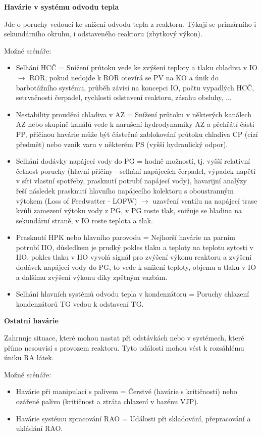 \textbf{Havárie v systému odvodu tepla}

Jde o poruchy vedoucí ke snížení odvodu tepla z reaktoru. Týkají se primárního i sekundárního okruhu, i odstaveného reaktoru (zbytkový výkon).

Možné  scénáře:

\begin{itemize}
    \item Selhání HCČ = Snížení průtoku vede ke zvýšení teploty a tlaku chladiva v IO $\rightarrow$ ROR, pokud nedojde k ROR otevírá se PV na KO a únik do barbotážního systému, průběh závisí na koncepci IO, počtu vypadlých HCČ, setrvačnosti čerpadel, rychlosti odstavení reaktoru, zásahu obsluhy, ...
    \item Nestability proudění chladiva v AZ = Snížení průtoku v některých kanálech AZ nebo skupině kanálů vede k narušení hydrodynamiky AZ a přehřátí části PP, příčinou havárie může být částečné zablokování průtoku chladiva CP (cizí předmět) nebo vznik varu v některém PS (vyšší hydraulický odpor).
    \item Selhání dodávky napájecí vody do PG = hodně možností, tj. vyšší relativní četnost poruchy (hlavní příčiny - selhání napájecích čerpadel, výpadek napětí v síti vlastní spotřeby, prasknutí potrubí napájecí vody), havarijní analýzy řeší následek prasknutí hlavního napájecího kolektoru s oboustranným výtokem (Loss of Feedwatter - LOFW) $\rightarrow$ uzavření ventilu na napájecí trase kvůli zamezení výtoku vody z PG, v PG roste tlak, snižuje se hladina na sekundární straně, v IO roste teplota a tlak.
    \item Prasknutí HPK nebo hlavního parovodu = Nejhorší havárie na parním potrubí IIO, důsledkem je prudký pokles tlaku a teploty na teplotu sytosti v IIO, pokles tlaku v IIO vyvolá signál pro zvýšení výkonu reaktoru a zvýšení dodávek napájecí vody do PG, to vede k snížení teploty, objemu a tlaku v IO a dalšímu zvýšení výkonu díky zpětným vazbám.
    \item Selhání hlavních systémů odvodu tepla v kondenzátoru = Poruchy chlazení kondenzátorů TG vedou k odstavení TG.
\end{itemize}

\textbf{Ostatní havárie}

Zahrnuje situace, které mohou nastat při odstávkách nebo v systémech, které přímo nesouvisí s provozem reaktoru. Tyto události mohou vést k rozsáhlému úniku RA látek.

Možné scénáře:

\begin{itemize}
    \item Havárie při manipulaci s palivem = Čerstvé (havárie s kritičností) nebo ozářené palivo (kritičnost a ztráta chlazení v bazénu VJP).
    \item Havárie systému zpracování RAO = Události při skladování, přepracování a ukládání RAO.
\end{itemize}

